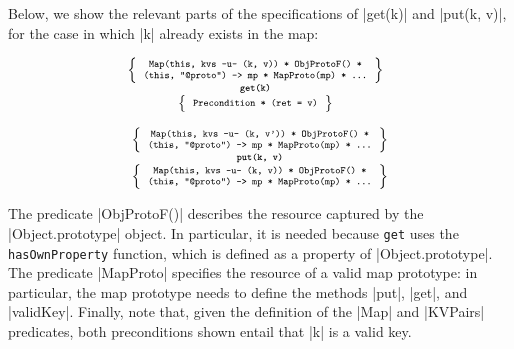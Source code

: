 Below, we show the relevant parts of the specifications of \jsinline|get(k)| and \jsinline|put(k, v)|, for the case in which
 \jsinline|k| already exists in the map:

\noindent
\begin{minipage}{0.475\textwidth}
\begin{displaymath} 
{\scriptsize
\hspace*{-0.2cm}
\begin{array}{c}
\left\{ {\begin{array}{c}
 \text{\texttt{Map(this, kvs -u- (k, v)) * ObjProtoF() *}} \\
 \text{\texttt{(this, "@proto") -> mp * MapProto(mp) * ...}}
\end{array}} \right\} \\
%
\text{\bfseries \texttt{get(k)}} \\[0.2mm]
%
\left\{ {\begin{array}{c}
 \text{\texttt{Precondition * (ret = v)}} 
\end{array}} \right\}
\end{array}
} 
\end{displaymath}
\end{minipage}
\quad
\begin{minipage}{0.48\textwidth}
%
\begin{displaymath} 
{\scriptsize
\begin{array}{c}
\left\{ {\begin{array}{c}
 \text{\texttt{Map(this, kvs -u- (k, v')) * ObjProtoF() *}} \\
 \text{\texttt{(this, "@proto") -> mp * MapProto(mp) * ...}}
\end{array}} \right\} \\
%
\text{\bfseries \texttt{put(k, v)}} \\[0.2mm]
%
\left\{ {\begin{array}{c}
 \text{\texttt{Map(this, kvs -u- (k, v)) * ObjProtoF() *}} \\
 \text{\texttt{(this, "@proto") -> mp * MapProto(mp) * ...}}
\end{array}} \right\}
\end{array}
} 
\end{displaymath}
\end{minipage}

\vspace{10pt}
The predicate \jsinline|ObjProtoF()| describes the resource captured by the \jsinline|Object.prototype| object. 
In particular, it is needed because \texttt{get} uses the \texttt{hasOwnProperty} function, which is defined as a property of \jsinline|Object.prototype|. 
The predicate \jsinline|MapProto| specifies the resource of a valid map prototype: in particular, the map prototype needs to define the methods \jsinline|put|, \jsinline|get|, and \jsinline|validKey|. Finally, note that, given the definition of the \jsinline|Map| and \jsinline|KVPairs| predicates, both preconditions shown entail that \jsinline|k| is a valid key.

